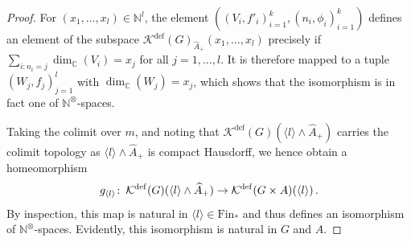\documentclass[10pt,a4paper]{amsart}
\newcommand{\C}{\mathbb{C}}
\newcommand{\Fin}{\mathrm{Fin}}
\newcommand{\Kdef}{\mathcal{K}^{\mathrm{def}}}
\newcommand{\N}{\mathbb{N}}
\newcommand{\co}{\colon\thinspace}
\begin{document}
\begin{proof}
For $(x_1,\dots,x_l)\in \N^l$, the element $((V_i,f'_i)_{i=1}^k,(n_i,\phi_i)_{i=1}^k)$ defines an element of the subspace $\Kdef(G)_{\widehat{A}_+}(x_1,\dots,x_l)$ precisely if $\sum_{i: n_i=j} \dim_{\C}(V_i)=x_j$ for all $j=1,\dots,l$. It is therefore mapped to a tuple $(W_j,f_j)_{j=1}^l$ with $\dim_{\C}(W_j)=x_j$, which shows that the isomorphism is in fact one of $\N^\otimes$-spaces.

Taking the colimit over $m$, and noting that $ \Kdef(G)(\langle l\rangle \wedge \widehat{A}_+)$ carries the colimit topology as $\langle l \rangle \wedge \widehat{A}_+$ is compact Hausdorff, we hence obtain a homeomorphism
\[
g_{\langle l\rangle}\co \Kdef(G)(\langle l \rangle\wedge \widehat{A}_+) \to \Kdef(G\times A)(\langle l \rangle)\, .
\]
By inspection, this map is natural in $\langle l \rangle\in \Fin_\ast$ and thus defines an isomorphism of $\N^\otimes$-spaces. Evidently, this isomorphism is natural in $G$ and $A$.
\end{proof}
\end{document}
